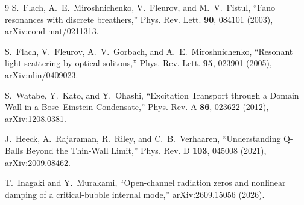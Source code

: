 \begin{thebibliography}{9}
S.~Flach, A.~E.~Miroshnichenko, V.~Fleurov, and M.~V.~Fistul,
``Fano resonances with discrete breathers,''
Phys. Rev. Lett. \textbf{90}, 084101 (2003), arXiv:cond-mat/0211313.

S.~Flach, V.~Fleurov, A.~V.~Gorbach, and A.~E.~Miroshnichenko,
``Resonant light scattering by optical solitons,''
Phys. Rev. Lett. \textbf{95}, 023901 (2005), arXiv:nlin/0409023.

S.~Watabe, Y.~Kato, and Y.~Ohashi,
``Excitation Transport through a Domain Wall in a Bose--Einstein Condensate,''
Phys. Rev. A \textbf{86}, 023622 (2012), arXiv:1208.0381.

J.~Heeck, A.~Rajaraman, R.~Riley, and C.~B.~Verhaaren,
``Understanding Q-Balls Beyond the Thin-Wall Limit,''
Phys. Rev. D \textbf{103}, 045008 (2021), arXiv:2009.08462.

T.~Inagaki and Y.~Murakami,
``Open-channel radiation zeros and nonlinear damping of a critical-bubble
internal mode,'' arXiv:2609.15056 (2026).

\end{thebibliography}
